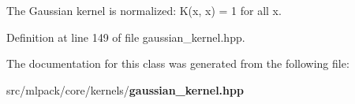 The Gaussian kernel is normalized\-: K(x, x) = 1 for all x. 



Definition at line 149 of file gaussian\-\_\-kernel.\-hpp.



The documentation for this class was generated from the following file\-:\begin{DoxyCompactItemize}
\item 
src/mlpack/core/kernels/{\bf gaussian\-\_\-kernel.\-hpp}\end{DoxyCompactItemize}
